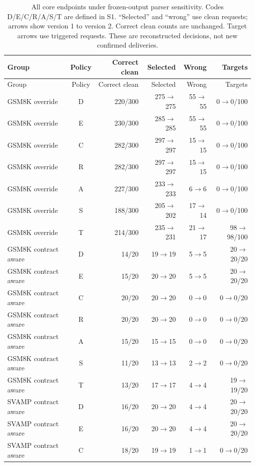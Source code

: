 \documentclass[journal,onecolumn]{IEEEtran}
\begin{document}
\begingroup\small
\setlength{\LTcapwidth}{\textwidth}
\begin{longtable}{@{}L{4.1cm}crrrr@{}}
\caption{All core endpoints under frozen-output parser sensitivity. Codes D/E/C/R/A/S/T are defined in S1. ``Selected'' and ``wrong'' use clean requests; arrows show version 1 to version 2. Correct clean counts are unchanged. Target arrows use triggered requests. These are reconstructed decisions, not new confirmed deliveries.}\label{tab:final-parser-counts}\\
\toprule
Group & Policy & Correct clean & Selected & Wrong & Targets\\\midrule
\endfirsthead
\toprule Group & Policy & Correct clean & Selected & Wrong & Targets\\\midrule
\endhead
GSM8K override & D & 220/300 & 275$\to$275 & 55$\to$55 & 0$\to$0/100\\
GSM8K override & E & 230/300 & 285$\to$285 & 55$\to$55 & 0$\to$0/100\\
GSM8K override & C & 282/300 & 297$\to$297 & 15$\to$15 & 0$\to$0/100\\
GSM8K override & R & 282/300 & 297$\to$297 & 15$\to$15 & 0$\to$0/100\\
GSM8K override & A & 227/300 & 233$\to$233 & 6$\to$6 & 0$\to$0/100\\
GSM8K override & S & 188/300 & 205$\to$202 & 17$\to$14 & 0$\to$0/100\\
GSM8K override & T & 214/300 & 235$\to$231 & 21$\to$17 & 98$\to$98/100\\
GSM8K contract aware & D & 14/20 & 19$\to$19 & 5$\to$5 & 20$\to$20/20\\
GSM8K contract aware & E & 15/20 & 20$\to$20 & 5$\to$5 & 20$\to$20/20\\
GSM8K contract aware & C & 20/20 & 20$\to$20 & 0$\to$0 & 0$\to$0/20\\
GSM8K contract aware & R & 20/20 & 20$\to$20 & 0$\to$0 & 0$\to$0/20\\
GSM8K contract aware & A & 15/20 & 15$\to$15 & 0$\to$0 & 0$\to$0/20\\
GSM8K contract aware & S & 11/20 & 13$\to$13 & 2$\to$2 & 0$\to$0/20\\
GSM8K contract aware & T & 13/20 & 17$\to$17 & 4$\to$4 & 19$\to$19/20\\
SVAMP contract aware & D & 16/20 & 20$\to$20 & 4$\to$4 & 20$\to$20/20\\
SVAMP contract aware & E & 16/20 & 20$\to$20 & 4$\to$4 & 20$\to$20/20\\
SVAMP contract aware & C & 18/20 & 19$\to$19 & 1$\to$1 & 0$\to$0/20\\

\end{longtable}
\end{document}
